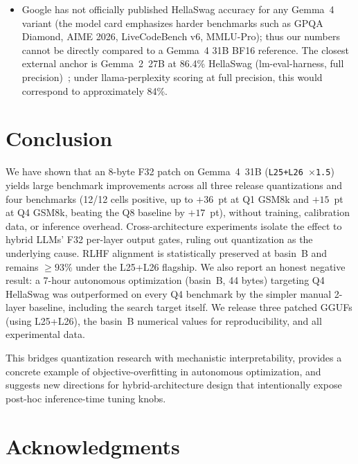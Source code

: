 \documentclass[11pt]{article}
\begin{document}
\begin{itemize}[leftmargin=*,itemsep=0pt]
  used in many published model cards. Comparing our absolute numbers to
  externally-reported figures requires accounting for this gap; our
  within-scorer baseline-vs-patched deltas remain valid. Reproducing our
  result with \texttt{lm-evaluation-harness} on the same patched GGUFs is
  left for follow-up and would likely yield even higher absolute baseline
  and patched numbers but similar (or slightly tighter) deltas.
  \item Google has not officially published HellaSwag accuracy for any
  Gemma~4 variant (the model card emphasizes harder benchmarks such as
  GPQA Diamond, AIME 2026, LiveCodeBench v6, MMLU-Pro); thus our numbers
  cannot be directly compared to a Gemma~4 31B BF16 reference. The closest
  external anchor is Gemma~2~27B at 86.4\% HellaSwag (lm-eval-harness, full
  precision)~\cite{llmstatshs}; under llama-perplexity scoring at full
  precision, this would correspond to approximately 84\%.
\end{itemize}

\section{Conclusion}

We have shown that an 8-byte F32 patch on Gemma~4~31B
(\texttt{L25+L26 $\times$1.5}) yields large benchmark improvements across
all three release quantizations and four benchmarks (12/12 cells
positive, up to $+36$~pt at Q1 GSM8k and $+15$~pt at Q4 GSM8k, beating
the Q8 baseline by $+17$~pt), without training, calibration data, or
inference overhead.
Cross-architecture experiments isolate the effect to hybrid LLMs' F32 per-layer output gates, ruling out quantization as the underlying cause.
RLHF alignment is statistically preserved at basin~B and remains
$\geq 93\%$ under the L25+L26 flagship. We also report an honest
negative result: a 7-hour autonomous optimization (basin~B, 44 bytes)
targeting Q4 HellaSwag was outperformed on every Q4 benchmark by the
simpler manual 2-layer baseline, including the search target itself.
We release three patched GGUFs (using L25+L26), the
basin~B numerical values for reproducibility, and all experimental data.

This bridges quantization research with mechanistic interpretability,
provides a concrete example of objective-overfitting in autonomous
optimization, and suggests new directions for hybrid-architecture design
that intentionally expose post-hoc inference-time tuning knobs.

\section*{Acknowledgments}
\end{document}
